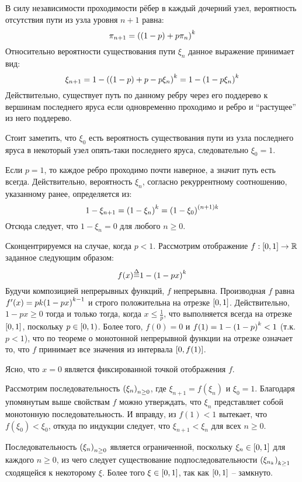 \documentclass[a4paper]{article}
\let\originalleft\left
\let\originalright\right
\renewcommand{\left}{\mathopen{}\mathclose\bgroup\originalleft}
\renewcommand{\right}{\aftergroup\egroup\originalright}
\newcommand{\clo}[1]{{\left [ #1 \right ]}}
\newcommand{\clop}[1]{{\left [ #1 \right )}}
\newcommand{\brac}[1]{{\left ( #1 \right )}}
\newcommand{\Real}{{\mathbb{R}}}
\newcommand{\defn}{{\mathop{\overset{\Delta}{=}}\nolimits}}
\begin{document}
В силу независимости проходимости рёбер в каждый дочерний узел,
вероятность отсутствия пути из узла уровня $n+1$ равна:
\[ \pi_{n+1} = \brac{ ( 1 - p ) + p \pi_n }^k\]
Относительно вероятности существования пути $\xi_n$ данное выражение
принимает вид:
\[ \xi_{n+1} = 1 - \brac{ ( 1 - p ) + p - p \xi_n }^k = 1 - \brac{ 1 - p \xi_n }^k\]
Действительно, существует путь по данному ребру через его поддерево
к вершинам последнего яруса если одновременно проходимо и ребро и
``растущее'' из него поддерево.

Стоит заметить, что $\xi_0$ есть вероятность существования пути из
узла последнего яруса в некоторый узел опять-таки последнего яруса,
следовательно $\xi_0 = 1$.

Если $p = 1$, то каждое ребро проходимо почти наверное, а значит
путь есть всегда. Действительно, вероятность $\xi_n$, согласно
рекуррентному соотношению, указанному ранее, определяется из:
\[1-\xi_{n+1} = \brac{ 1-\xi_n }^k = \brac{ 1-\xi_0 }^{(n+1)k}\]
Отсюда следует, что $1-\xi_n=0$ для любого $n\geq0$.

Сконцентрируемся на случае, когда $p<1$. Рассмотрим отображение
$f:\clo{0,1}\to \Real$ заданное следующим образом:
\[f(x) \defn 1 - \brac{ 1 - p x}^k\]
Будучи композицией непрерывных функций, $f$ непрерывна.
Производная $f$ равна $f'(x) = p k \brac{1 - p x}^{k-1}$ и строго
положительна на отрезке $\clo{0,1}$.
Действительно, $1 - p x\geq 0$ тогда и только тогда, когда
$x\leq \frac{1}{p}$, что выполняется всегда на отрезке $\clo{0,1}$,
поскольку $p\in\clop{0,1}$.
Более того, $f(0) = 0$ и $f(1) = 1 - \brac{1-p}^k < 1$ (т.к. $p<1$),
что по теореме о монотонной непрерывной функции на отрезке означает
то, что $f$ принимает все значения из интервала $\clo{0,f(1)}$.

Ясно, что $x=0$ является фиксированной точкой отображения $f$.

Рассмотрим последовательность $\brac{\xi_n}_{n\geq 0}$, где
$\xi_{n+1} = f(\xi_n)$ и $\xi_0 = 1$.
Благодаря упомянутым выше свойствам $f$ можно утверждать, что $\xi_n$
представляет собой монотонную последовательность.
И вправду, из $f(1) < 1$ вытекает, что $f(\xi_0)<\xi_0$, откуда по
индукции следует, что $\xi_{n+1}<\xi_n$ для всех $n\geq 0$.

Последовательность $\brac{\xi_n}_{n\geq0}$ является ограниченной,
поскольку $\xi_n\in\clo{0,1}$ для каждого $n\geq 0$, из чего следует
существование подпоследовательности $\brac{\xi_{n_k}}_{k\geq 1}$ сходящейся к
некоторому $\xi$.
Более того $\xi\in \clo{0,1}$, так как $\clo{0,1}$ -- замкнуто.
\end{document}
